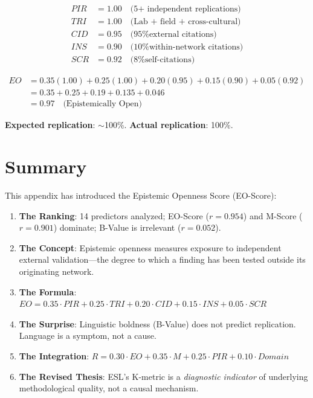 \documentclass[11pt,a4paper]{article}
\begin{document}
\begin{align*}
PIR &= 1.00 \quad \text{(5+ independent replications)} \\
TRI &= 1.00 \quad \text{(Lab + field + cross-cultural)} \\
CID &= 0.95 \quad \text{(95\% external citations)} \\
INS &= 0.90 \quad \text{(10\% within-network citations)} \\
SCR &= 0.92 \quad \text{(8\% self-citations)}
\end{align*}

\begin{align*}
EO &= 0.35(1.00) + 0.25(1.00) + 0.20(0.95) + 0.15(0.90) + 0.05(0.92) \\
   &= 0.35 + 0.25 + 0.19 + 0.135 + 0.046 \\
   &= 0.97 \quad \text{(Epistemically Open)}
\end{align*}

\textbf{Expected replication}: $\sim$100\%. \textbf{Actual replication}: 100\%.


\section{Summary}
\label{sec:summary}

This appendix has introduced the Epistemic Openness Score (EO-Score):

\begin{enumerate}
    \item \textbf{The Ranking}: 14 predictors analyzed; EO-Score ($r = 0.954$) and M-Score ($r = 0.901$) dominate; B-Value is irrelevant ($r = 0.052$).

    \item \textbf{The Concept}: Epistemic openness measures exposure to independent external validation---the degree to which a finding has been tested outside its originating network.

    \item \textbf{The Formula}: $EO = 0.35 \cdot PIR + 0.25 \cdot TRI + 0.20 \cdot CID + 0.15 \cdot INS + 0.05 \cdot SCR$

    \item \textbf{The Surprise}: Linguistic boldness (B-Value) does not predict replication. Language is a symptom, not a cause.

    \item \textbf{The Integration}: $R = 0.30 \cdot EO + 0.35 \cdot M + 0.25 \cdot PIR + 0.10 \cdot Domain$

    \item \textbf{The Revised Thesis}: ESL's K-metric is a \textit{diagnostic indicator} of underlying methodological quality, not a causal mechanism.
\end{enumerate}
\end{document}
